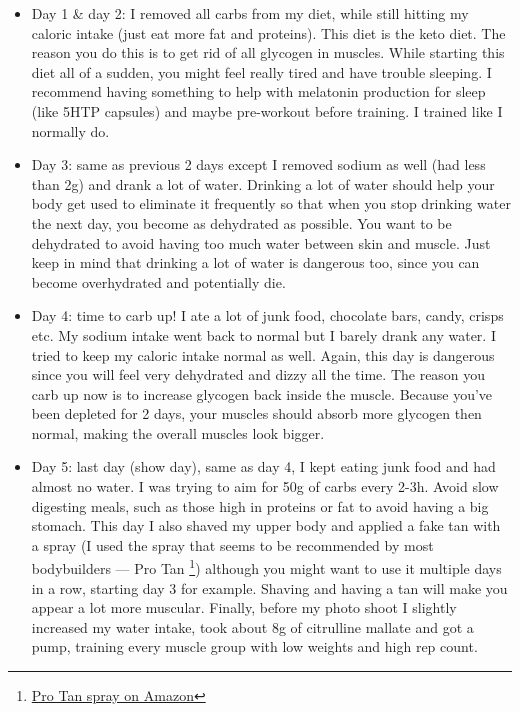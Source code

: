 \documentclass[openany, 12pt]{book}
\begin{document}
        \begin{itemize}
          \item Day 1 \& day 2: I removed all carbs from my diet, while still hitting my caloric intake (just eat more fat and proteins). This diet is the keto diet. The reason you do this is to
            get rid of all glycogen in muscles. While starting this diet all of a sudden, you might feel really tired and have trouble sleeping. I recommend having something to help with melatonin
            production for sleep (like 5HTP capsules) and maybe pre-workout before training. I trained like I normally do.
          \item Day 3: same as previous 2 days except I removed sodium as well (had less than 2g) and drank a lot of water. Drinking a lot of water should help your body get used to eliminate it
            frequently so that when you stop drinking water the next day, you become as dehydrated as possible. You want to be dehydrated to avoid having too much water between skin and
            muscle. Just keep in mind that drinking a lot of water is dangerous too, since you can
            become overhydrated and potentially die.
          \item Day 4: time to carb up! I ate a lot of junk food, chocolate bars, candy, crisps etc. My sodium intake went back to normal but I barely drank any water.
            I tried to keep my caloric intake normal as well. Again, this day is dangerous
            since you will feel very dehydrated and dizzy all the time. The reason you carb up now is to increase glycogen back inside the muscle. Because you've been depleted for 2 days,
            your muscles should absorb more glycogen then normal, making the overall muscles look bigger.
          \item Day 5: last day (show day), same as day 4, I kept eating junk food and had almost no water. I was trying to aim for 50g of carbs every 2-3h.
            Avoid slow digesting meals, such as those high in proteins or fat to avoid having a big
            stomach. This day I also shaved my upper body and applied a fake tan with a spray (I used the spray that seems to be recommended by most bodybuilders --- Pro Tan
            \footnote{\href{https://www.amazon.co.uk/gp/product/B001F6VDGI/}{Pro Tan spray on Amazon}}) although you might want to use it multiple days in a row, starting day 3 for example.
            Shaving and having a tan will make you appear a lot more muscular. Finally, before my photo shoot I slightly increased my water intake, took about 8g of citrulline mallate and got a pump,
            training every muscle group with low weights and high rep count.
        \end{itemize}
\end{document}
